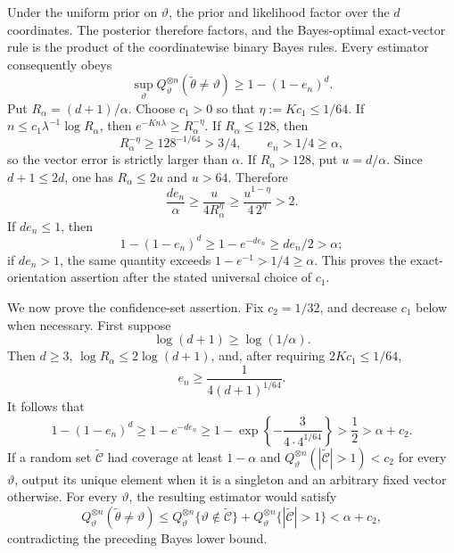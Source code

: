 Under the uniform prior on \(\vartheta\), the prior and likelihood factor over the \(d\) coordinates.  The posterior therefore factors, and the Bayes-optimal exact-vector rule is the product of the coordinatewise binary Bayes rules.  Every estimator consequently obeys
\[
\sup_{\vartheta}Q_\vartheta^{\otimes n}(\widetilde\theta\ne\vartheta)
\ge1-(1-e_n)^d.
\]
Put \(R_\alpha=(d+1)/\alpha\).  Choose \(c_1>0\) so that \(\eta:=Kc_1\le1/64\).  If \(n\le c_1\lambda^{-1}\log R_\alpha\), then \(e^{-Kn\lambda}\ge R_\alpha^{-\eta}\).  If \(R_\alpha\le128\), then
\[
R_\alpha^{-\eta}\ge128^{-1/64}>3/4,\qquad e_n>1/4\ge\alpha,
\]
so the vector error is strictly larger than \(\alpha\).  If \(R_\alpha>128\), put \(u=d/\alpha\).  Since \(d+1\le2d\), one has \(R_\alpha\le2u\) and \(u>64\).  Therefore
\[
\frac{de_n}{\alpha}\ge\frac{u}{4R_\alpha^\eta}\ge
\frac{u^{1-\eta}}{4\,2^\eta}>2.
\]
If \(de_n\le1\), then
\[
1-(1-e_n)^d\ge1-e^{-de_n}\ge de_n/2>\alpha;
\]
if \(de_n>1\), the same quantity exceeds \(1-e^{-1}>1/4\ge\alpha\).  This proves the exact-orientation assertion after the stated universal choice of \(c_1\).

We now prove the confidence-set assertion.  Fix \(c_2=1/32\), and decrease \(c_1\) below when necessary.  First suppose
\[
\log(d+1)\ge\log(1/\alpha).
\]
Then \(d\ge3\), \(\log R_\alpha\le2\log(d+1)\), and, after requiring \(2Kc_1\le1/64\),
\[
e_n\ge\frac1{4(d+1)^{1/64}}.
\]
It follows that
\[
1-(1-e_n)^d\ge1-e^{-de_n}\ge
1-\exp\left\{-\frac{3}{4\cdot4^{1/64}}\right\}>\frac12>\alpha+c_2.
\]
If a random set \(\widetilde{\mathcal C}\) had coverage at least \(1-\alpha\) and \(Q_\vartheta^{\otimes n}(|\widetilde{\mathcal C}|>1)<c_2\) for every \(\vartheta\), output its unique element when it is a singleton and an arbitrary fixed vector otherwise.  For every \(\vartheta\), the resulting estimator would satisfy
\[
Q_\vartheta^{\otimes n}(\widetilde\theta\ne\vartheta)\le
Q_\vartheta^{\otimes n}\{\vartheta\notin\widetilde{\mathcal C}\}
+Q_\vartheta^{\otimes n}\{|\widetilde{\mathcal C}|>1\}<\alpha+c_2,
\]
contradicting the preceding Bayes lower bound.

